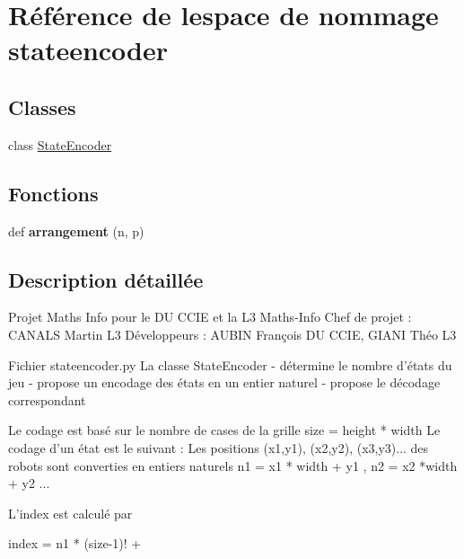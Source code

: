 \hypertarget{namespacestateencoder}{}\section{Référence de l\textquotesingle{}espace de nommage stateencoder}
\label{namespacestateencoder}
\subsection*{Classes}
\begin{DoxyCompactItemize}
\item 
class \hyperlink{classstateencoder_1_1StateEncoder}{State\+Encoder}
\end{DoxyCompactItemize}
\subsection*{Fonctions}
\begin{DoxyCompactItemize}
\item 
\mbox{\label{namespacestateencoder_a32de4422a9997ae1fcc66b21a8333549}} 
def {\bfseries arrangement} (n, p)
\end{DoxyCompactItemize}


\subsection{Description détaillée}
\begin{DoxyVerb}Projet Maths Info pour le DU CCIE et la L3 Maths-Info
Chef de projet : CANALS Martin L3
Développeurs : AUBIN François DU CCIE, GIANI Théo L3

Fichier stateencoder.py
La classe StateEncoder 
- détermine le nombre d'états du jeu
- propose un encodage des états en un entier naturel
- propose le décodage correspondant

Le codage est basé sur le nombre de cases de la grille
size = height * width
Le codage d'un état est le suivant :
Les positions (x1,y1), (x2,y2), (x3,y3)... des robots 
sont converties en entiers naturels
n1 = x1 * width + y1 , n2 = x2 *width + y2 ...

L'index est calculé par

index = n1 * (size-1)! + 
\end{DoxyVerb}
 